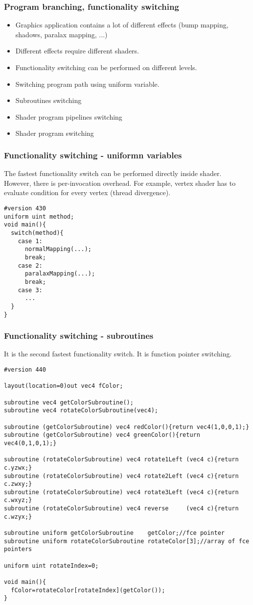 \begin{frame}[fragile]
\frametitle{Program branching, functionality switching}
  \begin{itemize}
    \item Graphics application contains a lot of different effects (bump mapping, shadows, paralax mapping, ...)
    \item Different effects require different shaders.
    \item Functionality switching can be performed on different levels.
    \item Switching program path using uniform variable.
    \item Subroutines switching
    \item Shader program pipelines switching
    \item Shader program switching
  \end{itemize}
\end{frame}

\begin{frame}[fragile]
\frametitle{Functionality switching - uniformn variables}
  The fastest functionality switch can be performed directly inside shader.
  However, there is per-invocation overhead.
  For example, vertex shader has to evaluate condition for every vertex (thread divergence).
    {\scriptsize
    \begin{verbatim}
#version 430
uniform uint method;
void main(){
  switch(method){
    case 1:
      normalMapping(...);
      break;
    case 2:
      paralaxMapping(...);
      break;
    case 3:
      ...
  }
}
    \end{verbatim}
    }
\end{frame}

\begin{frame}[fragile]
\frametitle{Functionality switching - subroutines}
  It is the second fastest functionality switch. It is function pointer switching.
    {\tiny
    \begin{verbatim}
#version 440

layout(location=0)out vec4 fColor;

subroutine vec4 getColorSubroutine();
subroutine vec4 rotateColorSubroutine(vec4);

subroutine (getColorSubroutine) vec4 redColor(){return vec4(1,0,0,1);}
subroutine (getColorSubroutine) vec4 greenColor(){return vec4(0,1,0,1);}

subroutine (rotateColorSubroutine) vec4 rotate1Left (vec4 c){return c.yzwx;}
subroutine (rotateColorSubroutine) vec4 rotate2Left (vec4 c){return c.zwxy;}
subroutine (rotateColorSubroutine) vec4 rotate3Left (vec4 c){return c.wxyz;}
subroutine (rotateColorSubroutine) vec4 reverse     (vec4 c){return c.wzyx;}

subroutine uniform getColorSubroutine    getColor;//fce pointer
subroutine uniform rotateColorSubroutine rotateColor[3];//array of fce pointers

uniform uint rotateIndex=0;

void main(){
  fColor=rotateColor[rotateIndex](getColor());
}
    \end{verbatim}
    }
\end{frame}

